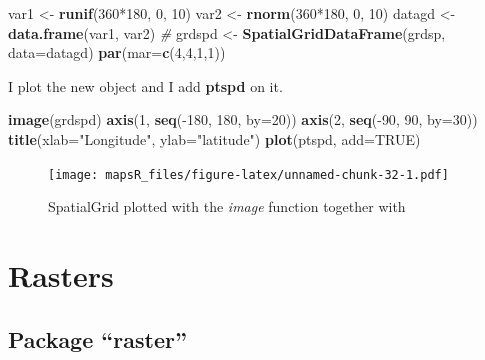 \documentclass[]{report}
\newenvironment{Shaded}{\begin{snugshade}}{\end{snugshade}}
\newcommand{\KeywordTok}[1]{\textcolor[rgb]{0.13,0.29,0.53}{\textbf{{#1}}}}
\newcommand{\DataTypeTok}[1]{\textcolor[rgb]{0.13,0.29,0.53}{{#1}}}
\newcommand{\DecValTok}[1]{\textcolor[rgb]{0.00,0.00,0.81}{{#1}}}
\newcommand{\StringTok}[1]{\textcolor[rgb]{0.31,0.60,0.02}{{#1}}}
\newcommand{\CommentTok}[1]{\textcolor[rgb]{0.56,0.35,0.01}{\textit{{#1}}}}
\newcommand{\OtherTok}[1]{\textcolor[rgb]{0.56,0.35,0.01}{{#1}}}
\newcommand{\NormalTok}[1]{{#1}}
\begin{document}
\begin{Shaded}
\begin{Highlighting}[]
\NormalTok{var1 <-}\StringTok{ }\KeywordTok{runif}\NormalTok{(}\DecValTok{360}\NormalTok{*}\DecValTok{180}\NormalTok{, }\DecValTok{0}\NormalTok{, }\DecValTok{10}\NormalTok{)}
\NormalTok{var2 <-}\StringTok{ }\KeywordTok{rnorm}\NormalTok{(}\DecValTok{360}\NormalTok{*}\DecValTok{180}\NormalTok{, }\DecValTok{0}\NormalTok{, }\DecValTok{10}\NormalTok{)}
\NormalTok{datagd <-}\StringTok{ }\KeywordTok{data.frame}\NormalTok{(var1, var2)}
\CommentTok{#}
\NormalTok{grdspd <-}\StringTok{ }\KeywordTok{SpatialGridDataFrame}\NormalTok{(grdsp, }\DataTypeTok{data=}\NormalTok{datagd)}
\KeywordTok{par}\NormalTok{(}\DataTypeTok{mar=}\KeywordTok{c}\NormalTok{(}\DecValTok{4}\NormalTok{,}\DecValTok{4}\NormalTok{,}\DecValTok{1}\NormalTok{,}\DecValTok{1}\NormalTok{))}
\end{Highlighting}
\end{Shaded}

I plot the new object and I add \textbf{ptspd} on it.

\begin{Shaded}
\begin{Highlighting}[]
\KeywordTok{image}\NormalTok{(grdspd)}
\KeywordTok{axis}\NormalTok{(}\DecValTok{1}\NormalTok{, }\KeywordTok{seq}\NormalTok{(-}\DecValTok{180}\NormalTok{, }\DecValTok{180}\NormalTok{, }\DataTypeTok{by=}\DecValTok{20}\NormalTok{))}
\KeywordTok{axis}\NormalTok{(}\DecValTok{2}\NormalTok{, }\KeywordTok{seq}\NormalTok{(-}\DecValTok{90}\NormalTok{, }\DecValTok{90}\NormalTok{, }\DataTypeTok{by=}\DecValTok{30}\NormalTok{))}
\KeywordTok{title}\NormalTok{(}\DataTypeTok{xlab=}\StringTok{"Longitude"}\NormalTok{, }\DataTypeTok{ylab=}\StringTok{"latitude"}\NormalTok{)}
\KeywordTok{plot}\NormalTok{(ptspd, }\DataTypeTok{add=}\OtherTok{TRUE}\NormalTok{)}
\end{Highlighting}
\end{Shaded}

\begin{figure}[htbp]
\centering
\texttt{[image: mapsR\_files/figure-latex/unnamed-chunk-32-1.pdf]}
\caption{SpatialGrid plotted with the \emph{image} function together
with}
\end{figure}

\chapter{Rasters}\label{rasters}

\section{\texorpdfstring{Package
``raster''}{Package raster}}\label{package-raster}
\end{document}
